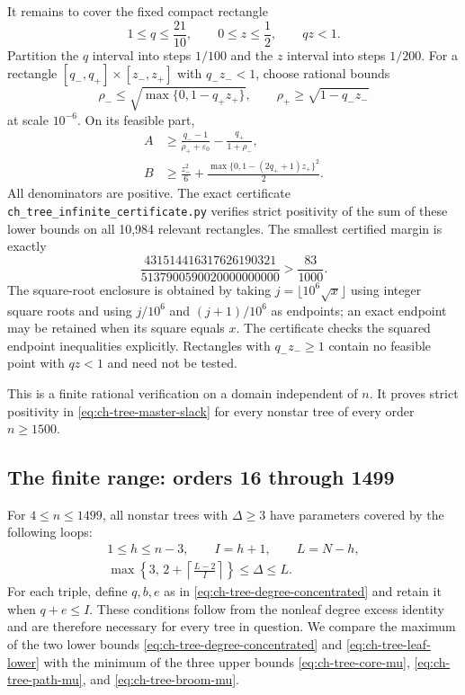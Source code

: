 \documentclass[11pt,a4paper]{article}
\theoremstyle{remark}
\numberwithin{equation}{section}
\begin{document}
It remains to cover the fixed compact rectangle
\[
 1\le q\le\frac{21}{10},\qquad 0\le z\le\frac12,
 \qquad qz<1.
\]
Partition the $q$ interval into steps $1/100$ and the $z$ interval into
steps $1/200$. For a rectangle
$[q_-,q_+]\times[z_-,z_+]$ with $q_-z_-<1$, choose rational bounds
\[
 \rho_-\le\sqrt{\max\{0,1-q_+z_+\}},\qquad
 \rho_+\ge\sqrt{1-q_-z_-}
\]
at scale $10^{-6}$. On its feasible part,
\begin{align*}
 A&\ge\frac{q_--1}{\rho_++\varepsilon_0}
                              -\frac{q_+}{1+\rho_-},\\
 B&\ge\frac{z_-^2}{6}
                     +\frac{\max\{0,1-(2q_++1)z_+\}^2}{2}.
\end{align*}
All denominators are positive. The exact certificate
\texttt{ch\_tree\_infinite\_certificate.py} verifies strict positivity
of the sum of these lower bounds on all 10,984 relevant rectangles.
The smallest certified margin is exactly
\[
 \frac{431514416317626190321}{5137900590020000000000}
 >\frac{83}{1000}.
\]
The square-root enclosure is obtained by taking
$j=\lfloor10^6\sqrt x\rfloor$ using integer square roots and using
$j/10^6$ and $(j+1)/10^6$ as endpoints; an exact endpoint may be retained
when its square equals $x$. The certificate checks the squared endpoint
inequalities explicitly. Rectangles with $q_-z_-\ge1$ contain no
feasible point with $qz<1$ and need not be tested.

This is a finite rational verification on a domain independent of $n$.
It proves strict positivity in \eqref{eq:ch-tree-master-slack} for every
nonstar tree of every order $n\ge1500$.

\subsection{The finite range: orders 16 through 1499}

For $4\le n\le1499$, all nonstar trees with $\Delta\ge3$ have parameters
covered by the following loops:
\[
 \begin{gathered}
 1\le h\le n-3,\qquad I=h+1,\qquad L=N-h,\\
 \max\left\{3,\,2+\left\lceil\frac{L-2}{I}\right\rceil\right\}
       \le\Delta\le L.
 \end{gathered}
\]
For each triple, define $q,b,e$ as in
\eqref{eq:ch-tree-degree-concentrated} and retain it when $q+e\le I$.
These conditions follow from the nonleaf degree excess identity and
are therefore necessary for every tree in question.
We compare the maximum of the two lower bounds
\eqref{eq:ch-tree-degree-concentrated} and
\eqref{eq:ch-tree-leaf-lower} with the minimum of the three upper bounds
\eqref{eq:ch-tree-core-mu}, \eqref{eq:ch-tree-path-mu}, and
\eqref{eq:ch-tree-broom-mu}.
\end{document}
